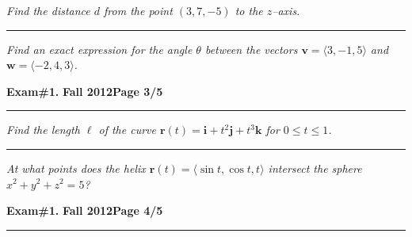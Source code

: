 \documentclass[12pt]{article}
\begin{document}
\bigskip
{\problem[15 pts] \em  Find the distance $d$ from the point $(3,7,-5)$ to the $z$--axis.} 
\vspace{8.5cm}
\begin{flushright}
\end{flushright}
\hrule
{\problem[15 pts] \em Find an exact expression for the angle $\theta$ between
the vectors $\boldsymbol{v}=\langle 3, -1, 5\rangle$ and
$\boldsymbol{w}=\langle -2, 4, 3\rangle$.} 
\vspace{8.5cm}
\begin{flushright}
\end{flushright}
\newpage

\hfill{\large\bf Exam\#1.}\hfill{\large\bf
  Fall 2012}\hfill{\large\bf Page 3/5}\hrule

\bigskip
{\problem[15 pts] \em Find the length $\ell$ of the curve $\boldsymbol{r}(t) =
\boldsymbol{i} + t^2 \boldsymbol{j} + t^3 \boldsymbol{k}$ for $0 \leq t \leq
1$.} 
\vspace{9.5cm}
\begin{flushright}
\end{flushright}
\hrule
{\problem[10 pts] \em At what points does the helix $\boldsymbol{r}(t) = \langle \sin t, \cos t, t \rangle$ intersect the sphere $x^2+y^2+z^2=5$?}
\vspace{7.5cm}
\begin{flushright}
\end{flushright}
\newpage

\hfill{\large\bf Exam\#1.}\hfill{\large\bf
  Fall 2012}\hfill{\large\bf Page 4/5}\hrule
\end{document}
